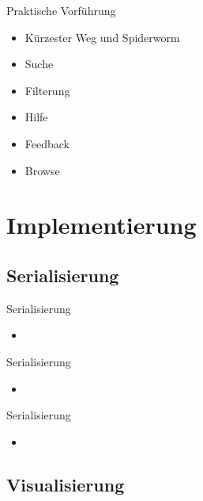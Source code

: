 \documentclass[14pt,aspectratio=1610]{beamer}
\begin{document}
\begin{frame}{Praktische Vorführung}
\begin{itemize}
\item Kürzester Weg und Spiderworm
\item Suche
\item Filterung
\item Hilfe
\item Feedback
\item Browse
\end{itemize}
\end{frame}

\section{Implementierung}%

\subsection{Serialisierung}%

\begin{frame}{Serialisierung}
\begin{block}{}
\begin{itemize}
\item 
\end{itemize}
\end{block}
\end{frame}

\begin{frame}{Serialisierung}
\begin{block}{}
\begin{itemize}
\item 
\end{itemize}
\end{block}
\end{frame}

\begin{frame}{Serialisierung}
\begin{block}{}
\begin{itemize}
\item 
\end{itemize}
\end{block}
\end{frame}

\subsection{Visualisierung}%
\end{document}
